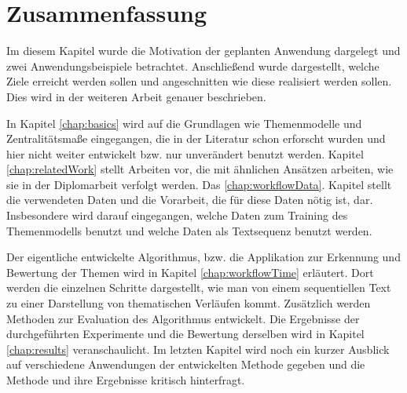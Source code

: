 \section{Zusammenfassung}
Im diesem Kapitel wurde die Motivation der geplanten Anwendung dargelegt und zwei Anwendungsbeispiele betrachtet. Anschließend wurde dargestellt, welche Ziele erreicht werden sollen und angeschnitten wie diese realisiert werden sollen. Dies wird in der weiteren Arbeit genauer beschrieben. 

In Kapitel \ref{chap:basics} wird auf die Grundlagen wie Themenmodelle und Zentralitätsmaße eingegangen, die in der Literatur schon erforscht wurden und hier nicht weiter entwickelt bzw. nur unverändert benutzt werden. Kapitel \ref{chap:relatedWork} stellt Arbeiten vor, die mit ähnlichen Ansätzen arbeiten, wie sie in der Diplomarbeit verfolgt werden. Das \ref{chap:workflowData}. Kapitel stellt die verwendeten Daten und die Vorarbeit, die für diese Daten nötig ist, dar. Insbesondere wird darauf eingegangen, welche Daten zum Training des Themenmodells benutzt und welche Daten als Textsequenz benutzt werden. 

Der eigentliche entwickelte Algorithmus, bzw. die Applikation zur Erkennung und Bewertung der Themen wird in Kapitel \ref{chap:workflowTime} erläutert. Dort werden die einzelnen Schritte dargestellt, wie man von einem sequentiellen Text zu einer Darstellung von thematischen Verläufen kommt. Zusätzlich werden Methoden zur Evaluation des Algorithmus entwickelt. Die Ergebnisse der durchgeführten Experimente und die Bewertung derselben wird in Kapitel \ref{chap:results} veranschaulicht. Im letzten Kapitel wird noch ein kurzer Ausblick auf verschiedene Anwendungen der entwickelten Methode gegeben und die Methode und ihre Ergebnisse kritisch hinterfragt. 